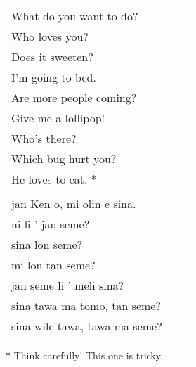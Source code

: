 \begin{supertabular}{p{5,5cm}|ll}
What do you want to do? &&   \\ %
Who loves you? &&   \\ %
Does it sweeten?  &&  \\ %
I'm going to bed. && \\  %
Are more people coming? &&  \\  %
Give me a lollipop! && \\   %
Who's there? &&   \\ %
Which bug hurt you?  &&  \\ %
He loves to eat. * &&  \\ %
 && \\ %
jan Ken o, mi olin e sina.  && \\  %
ni li ' jan seme?  && \\  %
sina lon seme?   && \\  %
mi lon tan seme?  && \\  %
jan seme li ' meli sina?   && \\    %
sina tawa ma tomo, tan seme?    && \\   %
sina wile tawa, tawa  ma seme?      && \\  %
\end{supertabular} 

* Think carefully! This one is tricky. 
